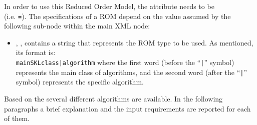 In order to use this Reduced Order Model, the  attribute
 needs to be \\  (i.e. 
\textbf{\texttt{=}}).
%
The specifications of a  ROM depend on the value assumed
by the following sub-node within the main  XML node:
\begin{itemize}
  \item {}, , contains a string that represents the ROM type to be used.
  As mentioned, its format is:\\
  \texttt{mainSKLclass|algorithm} where the
  first word (before the ``\texttt{|}'' symbol) represents the main class of
  algorithms, and the second word (after the ``\texttt{|}'' symbol) represents
  the specific algorithm.
\end{itemize}
Based on the  several different algorithms are available.
%
In the following paragraphs a brief explanation and the input requirements are
reported for each of them.
%
